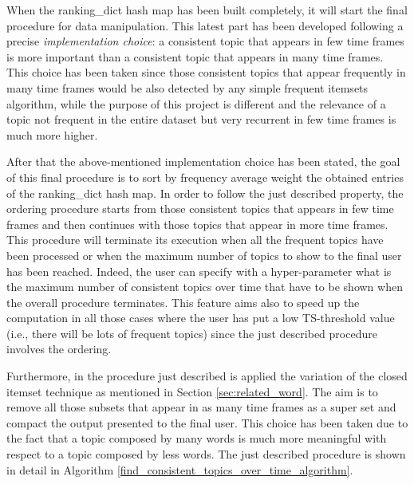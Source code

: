 When the ranking\_dict hash map has been built completely, it will start the final procedure for data manipulation. This latest part has been developed following a precise \textit{implementation choice}: a consistent topic that appears in few time frames is more important than a consistent topic that appears in many time frames. This choice has been taken since those consistent topics that appear frequently in many time frames would be also detected by any simple frequent itemsets algorithm, while the purpose of this project is different and the relevance of a topic not frequent in the entire dataset but very recurrent in few time frames is much more higher.

\noindent After that the above-mentioned implementation choice has been stated, the goal of this final procedure is to sort by frequency average weight the obtained entries of the ranking\_dict hash map. In order to follow the just described property, the ordering procedure starts from those consistent topics that appears in few time frames and then continues with those topics that appear in more time frames. This procedure will terminate its execution when all the frequent topics have been processed or when the maximum number of topics to show to the final user has been reached. Indeed, the user can specify with a hyper-parameter what is the maximum number of consistent topics over time that have to be shown when the overall procedure terminates. This feature aims also to speed up the computation in all those cases where the user has put a low TS-threshold value (i.e., there will be lots of frequent topics) since the just described procedure involves the ordering.

\noindent Furthermore, in the procedure just described is applied the variation of the closed itemset technique as mentioned in Section \ref{sec:related_word}. The aim is to remove all those subsets that appear in as many time frames as a super set and compact the output presented to the final user. This choice has been taken due to the fact that a topic composed by many words is much more meaningful with respect to a topic composed by less words. The just described procedure is shown in detail in Algorithm \ref{find_consistent_topics_over_time_algorithm}.

